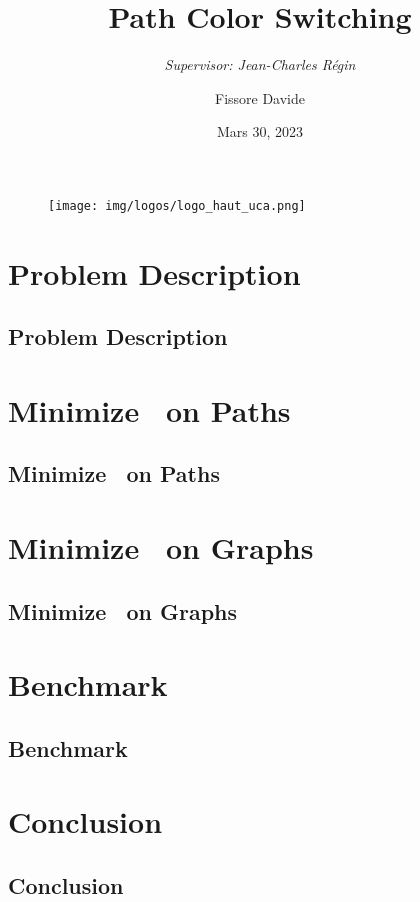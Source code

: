 \documentclass[usenames,dvipsnames,fleqn]{beamer}
\author{Fissore Davide}
\title{
    Path Color Switching\\
}
\subtitle{
    \small{\textit{Supervisor: Jean-Charles Régin}}
}
\date{Mars 30, 2023}
\begin{document}
\begin{frame}
    \titlepage
    \begin{figure}[htpb]
        \begin{center}
            \texttt{[image: img/logos/logo\_haut\_uca.png]}
        \end{center}
    \end{figure}
\end{frame}


\newcommand{\secsub}[1]{
    \section{#1}
    \subsection{#1}
}

\AtBeginSection[] {}

\secsub{Problem Description}

\secsub{Minimize \ on Paths}

\secsub{Minimize \colorSwitch\ on Graphs}

\secsub{Benchmark}

\secsub{Conclusion}

\end{document}
